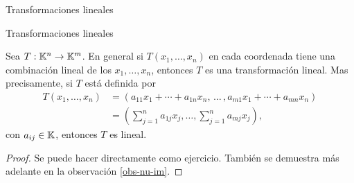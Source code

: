 \begin{chapter}{Transformaciones lineales}
\begin{section}{Transformaciones lineales}
            \begin{obs}\label{obs-tl-1.5} 	Sea $T: \mathbb K^n \to \mathbb K^m$. En  general si $T(x_1,\ldots,x_n)$ en cada coordenada tiene una combinación lineal de los $x_1,\ldots,x_n$,  entonces $T$ es una transformación lineal. Mas precisamente, si $T$ está definida por
                \begin{align*}
                T(x_1,\ldots,x_n) &= (a_{11}x_1+\cdots + a_{1n}x_n,\, \ldots\,,a_{m1}x_1+\cdots + a_{mn}x_n )\\
                &=(\sum_{j=1}^n a_{1j} x_j,\ldots,\sum_{j=1}^n a_{mj} x_j),
                \end{align*}
                con $a_{ij} \in \mathbb K$, entonces $T$  es lineal. 
            \end{obs}
            \begin{proof} Se puede hacer directamente como ejercicio. También se demuestra más adelante en la observación \ref{obs-nu-im}. 
            \begin{comment}
                Sean $(x_1,\cdots,x_n), (y_1,\cdots,y_n) \in \K^n$ y $\lambda \in \K$,  entonces
                \begin{align*}
                T(\lambda(x_1,\cdots,x_n)+ (y_1,\cdots,y_n)) &= T(\lambda x_1+y_1,\ldots,\lambda x_n+y_n) \\
                &= (\sum_{j=1}^n a_{1j} (\lambda x_j+y_j),\ldots,\sum_{j=1}^n a_{mj} (\lambda x_j+y_j)) \\
                &= (\lambda\sum_{j=1}^n a_{1j} x_j+\sum_{j=1}^n a_{1j} y_j,\ldots,\lambda\sum_{j=1}^n a_{mj} x_j+\sum_{j=1}^n a_{mj} y_j) \\
                &= \lambda(\sum_{j=1}^n a_{1j} x_j,\ldots,\sum_{j=1}^n a_{mj} x_j) +(\sum_{j=1}^n a_{1j} y_j,\ldots,\sum_{j=1}^n a_{mj} y_j) \\
                & =\lambda T(x_1,\cdots,x_n)+ T(y_1,\cdots,y_n).
                \end{align*}
            \end{comment}
            \end{proof}
            

\end{section}
\end{chapter}
